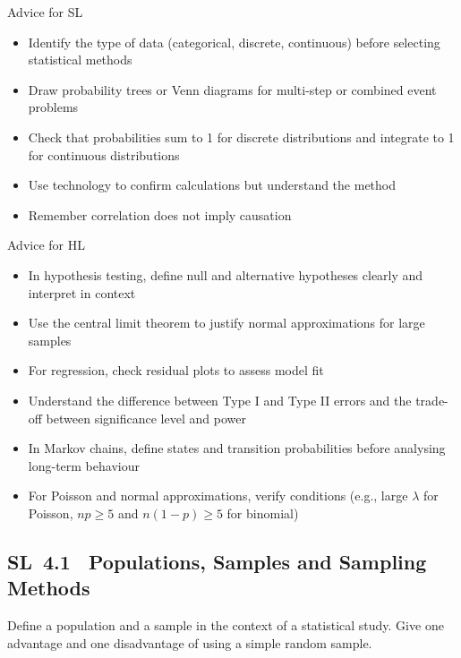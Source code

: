 \documentclass[11pt]{article}
\def\textbf#1{#1}%
\newcommand{\tocsubsection}[1]{\subsection{#1}}
\newcounter{question}
\begin{document}
\textbf{Advice for SL}  
\begin{itemize}
  \item Identify the type of data (categorical, discrete, continuous) before selecting statistical methods
  \item Draw probability trees or Venn diagrams for multi-step or combined event problems
  \item Check that probabilities sum to 1 for discrete distributions and integrate to 1 for continuous distributions
  \item Use technology to confirm calculations but understand the method
  \item Remember correlation does not imply causation
\end{itemize}

\textbf{Advice for HL}  
\begin{itemize}
  \item In hypothesis testing, define null and alternative hypotheses clearly and interpret in context
  \item Use the central limit theorem to justify normal approximations for large samples
  \item For regression, check residual plots to assess model fit
  \item Understand the difference between Type I and Type II errors and the trade-off between significance level and power
  \item In Markov chains, define states and transition probabilities before analysing long-term behaviour
  \item For Poisson and normal approximations, verify conditions (e.g., large $\lambda$ for Poisson, $np \geq 5$ and $n(1-p) \geq 5$ for binomial)
\end{itemize}


\tocsubsection{SL 4.1 \; Populations, Samples and Sampling Methods}

\begin{question}
Define a population and a sample in the context of a statistical study.  Give
one advantage and one disadvantage of using a simple random sample.
\end{question}


\end{document}
